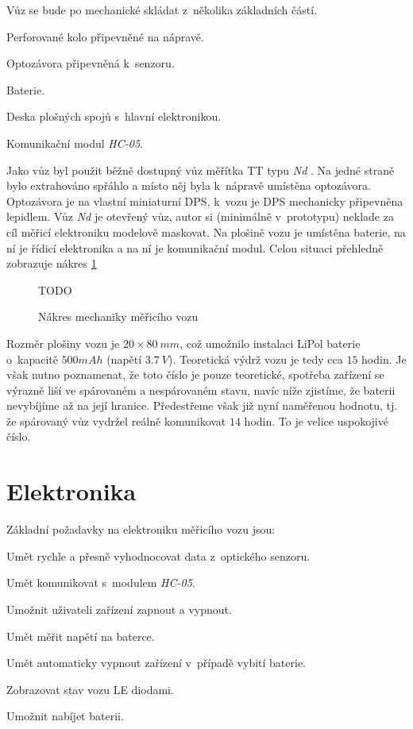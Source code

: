 Vůz se bude po mechanické skládat z~několika základních částí.

\begin{compactenum}
\item Perforované kolo připevněné na nápravě.
\item Optozávora připevněná k~senzoru.
\item Baterie.
\item Deska plošných spojů s~hlavní elektronikou.
\item Komunikační modul \textit{HC-05}.
\end{compactenum}

Jako vůz byl použit běžně dostupný vůz měřítka TT typu \textit{Nd}
\cite{vuz-nd}. Na jedné straně bylo extrahováno spřáhlo a místo něj byla
k~nápravě umístěna optozávora. Optozávora je na vlastní miniaturní DPS, k~vozu
je DPS mechanicky připevněna lepidlem. Vůz \textit{Nd} je otevřený vůz, autor si
(minimálně v~prototypu) neklade za cíl měřicí elektroniku modelově maskovat. Na
plošině vozu je umístěna baterie, na ní je řídicí elektronika a na ní je
komunikační modul. Celou situaci přehledně zobrazuje nákres
\ref{fig:vuz-nakres}

\begin{figure}[h]
TODO
\caption{Nákres mechaniky měřicího vozu}
\label{fig:vuz-nakres}
\end{figure}

Rozměr plošiny vozu je $20\times80\ mm$, což umožnilo instalaci LiPol baterie
o~kapacitě $500 mAh$ (napětí $3.7\ V$). Teoretická výdrž vozu je tedy cca $15$
hodin. Je však nutno poznamenat, že toto číslo je pouze teoretické, spotřeba
zařízení se výrazně liší ve spárovaném a nespárovaném stavu, navíc níže
zjistíme, že baterii nevybíjíme až na její hranice. Předestřeme však již nyní
naměřenou hodnotu, tj. že spárovaný vůz vydržel reálně komunikovat $14$ hodin.
To je velice uspokojivé číslo.

\section{Elektronika}
\label{sec:wsm-ele}

Základní požadavky na elektroniku měřicího vozu jsou:

\begin{compactenum}
\item Umět rychle a přesně vyhodnocovat data z~optického senzoru.
\item Umět komunikovat s~modulem \textit{HC-05}.
\item Umožnit uživateli zařízení zapnout a vypnout.
\item Umět měřit napětí na baterce.
\item Umět automaticky vypnout zařízení v~případě vybití baterie.
\item Zobrazovat stav vozu LE diodami.
\item Umožnit nabíjet baterii.
\end{compactenum}


